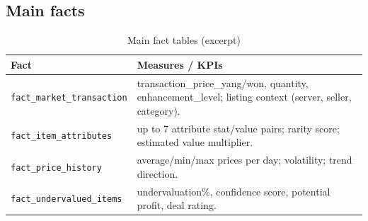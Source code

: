 \subsection{Main facts}
\begin{table}[!ht]
\centering
\caption{Main fact tables (excerpt)}
\begin{tabularx}{\linewidth}{@{}lX@{}}
\toprule
\textbf{Fact} & \textbf{Measures / KPIs} \\
\midrule
\texttt{fact\_market\_transaction} & transaction\_price\_yang/won, quantity, enhancement\_level; listing context (server, seller, category). \\
\texttt{fact\_item\_attributes} & up to 7 attribute stat/value pairs; rarity score; estimated value multiplier. \\
\texttt{fact\_price\_history} & average/min/max prices per day; volatility; trend direction. \\
\texttt{fact\_undervalued\_items} & undervaluation\%, confidence score, potential profit, deal rating. \\
\bottomrule
\end{tabularx}
\end{table}


